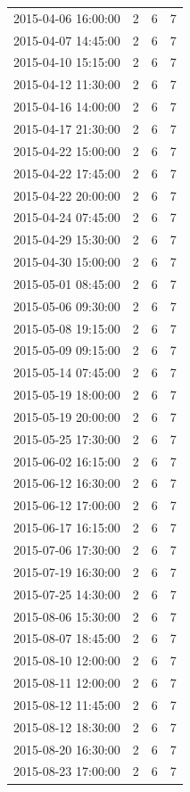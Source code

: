 \begin{tabular}{lrrr}
2015-04-06 16:00:00 & 2 & 6 & 7 \\
2015-04-07 14:45:00 & 2 & 6 & 7 \\
2015-04-10 15:15:00 & 2 & 6 & 7 \\
2015-04-12 11:30:00 & 2 & 6 & 7 \\
2015-04-16 14:00:00 & 2 & 6 & 7 \\
2015-04-17 21:30:00 & 2 & 6 & 7 \\
2015-04-22 15:00:00 & 2 & 6 & 7 \\
2015-04-22 17:45:00 & 2 & 6 & 7 \\
2015-04-22 20:00:00 & 2 & 6 & 7 \\
2015-04-24 07:45:00 & 2 & 6 & 7 \\
2015-04-29 15:30:00 & 2 & 6 & 7 \\
2015-04-30 15:00:00 & 2 & 6 & 7 \\
2015-05-01 08:45:00 & 2 & 6 & 7 \\
2015-05-06 09:30:00 & 2 & 6 & 7 \\
2015-05-08 19:15:00 & 2 & 6 & 7 \\
2015-05-09 09:15:00 & 2 & 6 & 7 \\
2015-05-14 07:45:00 & 2 & 6 & 7 \\
2015-05-19 18:00:00 & 2 & 6 & 7 \\
2015-05-19 20:00:00 & 2 & 6 & 7 \\
2015-05-25 17:30:00 & 2 & 6 & 7 \\
2015-06-02 16:15:00 & 2 & 6 & 7 \\
2015-06-12 16:30:00 & 2 & 6 & 7 \\
2015-06-12 17:00:00 & 2 & 6 & 7 \\
2015-06-17 16:15:00 & 2 & 6 & 7 \\
2015-07-06 17:30:00 & 2 & 6 & 7 \\
2015-07-19 16:30:00 & 2 & 6 & 7 \\
2015-07-25 14:30:00 & 2 & 6 & 7 \\
2015-08-06 15:30:00 & 2 & 6 & 7 \\
2015-08-07 18:45:00 & 2 & 6 & 7 \\
2015-08-10 12:00:00 & 2 & 6 & 7 \\
2015-08-11 12:00:00 & 2 & 6 & 7 \\
2015-08-12 11:45:00 & 2 & 6 & 7 \\
2015-08-12 18:30:00 & 2 & 6 & 7 \\
2015-08-20 16:30:00 & 2 & 6 & 7 \\
2015-08-23 17:00:00 & 2 & 6 & 7 \\

\end{tabular}
